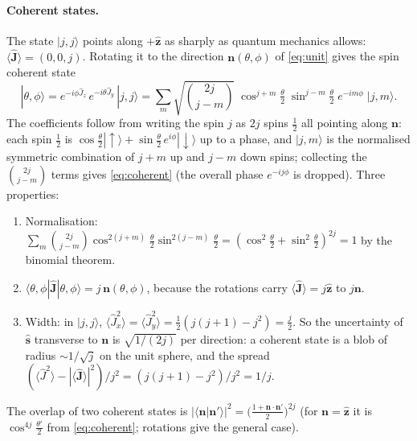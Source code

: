 \documentclass[11pt,a4paper]{article}
\newcommand{\vJ}{\bm{J}}
\begin{document}
\paragraph{Coherent states.} The state $|j,j\rangle$ points along $+\hat{\bm z}$ as sharply as quantum mechanics
allows: $\langle\hat{\vJ}\rangle = (0,0,j)$. Rotating it to the direction $\bm n(\theta,\phi)$ of \eqref{eq:unit}
gives the spin coherent state
\begin{equation}\label{eq:coherent}
  |\theta,\phi\rangle = e^{-i\phi\hat J_z}\,e^{-i\theta\hat J_y}\,|j,j\rangle
  = \sum_m \sqrt{\binom{2j}{j-m}}\;\cos^{j+m}\!\tfrac{\theta}{2}\;\sin^{j-m}\!\tfrac{\theta}{2}\;e^{-im\phi}\;|j,m\rangle .
\end{equation}
The coefficients follow from writing the spin $j$ as $2j$ spins $\frac12$ all pointing along $\bm n$: each spin
$\frac12$ is $\cos\frac\theta2|\!\uparrow\rangle + \sin\frac\theta2\,e^{i\phi}|\!\downarrow\rangle$ up to a phase, and
$|j,m\rangle$ is the normalised symmetric combination of $j+m$ up and $j-m$ down spins; collecting the
$\binom{2j}{j-m}$ terms gives \eqref{eq:coherent} (the overall phase $e^{-ij\phi}$ is dropped). Three properties:
\begin{enumerate}
  \item Normalisation: $\sum_m\binom{2j}{j-m}\cos^{2(j+m)}\frac\theta2\sin^{2(j-m)}\frac\theta2 =
  (\cos^2\frac\theta2 + \sin^2\frac\theta2)^{2j} = 1$ by the binomial theorem.
  \item $\langle\theta,\phi|\hat{\vJ}|\theta,\phi\rangle = j\,\bm n(\theta,\phi)$, because the rotations carry
  $\langle\hat{\vJ}\rangle = j\hat{\bm z}$ to $j\bm n$.
  \item Width: in $|j,j\rangle$, $\langle\hat J_x^2\rangle = \langle\hat J_y^2\rangle = \frac12(j(j+1) - j^2) =
  \frac j2$. So the uncertainty of $\hat{\bm s}$ transverse to $\bm n$ is $\sqrt{1/(2j)}$ per direction: a coherent
  state is a blob of radius $\sim 1/\sqrt j$ on the unit sphere, and the spread
  $(\langle\hat J^2\rangle - |\langle\hat{\vJ}\rangle|^2)/j^2 = (j(j+1)-j^2)/j^2 = 1/j$.
\end{enumerate}
The overlap of two coherent states is $|\langle\bm n|\bm n'\rangle|^2 = \big(\frac{1+\bm n\cdot\bm n'}{2}\big)^{2j}$
(for $\bm n = \hat{\bm z}$ it is $\cos^{4j}\frac{\theta'}{2}$ from \eqref{eq:coherent}; rotations give the general case).
\end{document}
